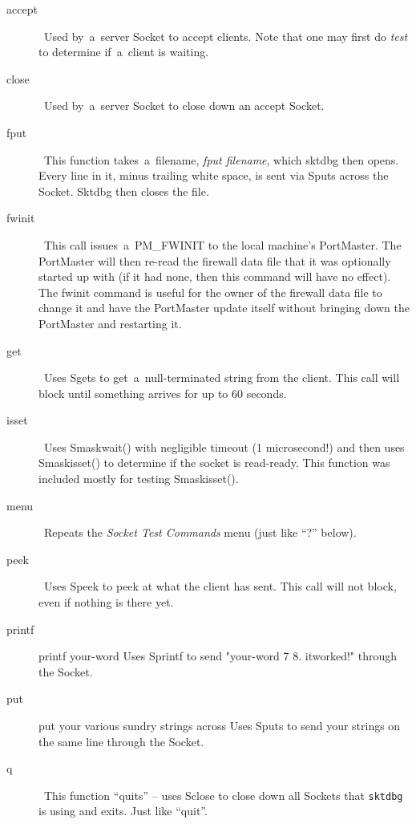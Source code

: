 \documentclass[12pt]{article}
\begin{document}
\begin{description}

  \item[accept] \   Used by~a~server Socket to accept clients.  Note that one
  may first do {\em test} to determine if~a~client is waiting.

  \item[close] \   Used by~a~server Socket to close down an accept Socket.

  \item[fput] \   This function takes~a~filename, {\em fput filename}, which sktdbg then opens.
  Every line in it, minus trailing white space, is sent via Sputs across the
  Socket.  Sktdbg then closes the file.

  \item[fwinit] \   This call issues~a~{\small PM\_FWINIT} to the local machine's PortMaster.
  The PortMaster will then re-read the firewall data file that it was optionally
  started up with (if it had none, then this command will have no effect).  The
  fwinit command is useful for the owner of the firewall data file to change it
  and have the PortMaster update itself without bringing down the PortMaster and
  restarting it.

  \item[get] \   Uses Sgets to get~a~null-terminated string from the client.  This call will
  block until something arrives for up to 60 seconds.

  \item[isset] \   Uses Smaskwait() with negligible timeout (1 microsecond!) and then uses
  Smaskisset() to determine if the socket is read-ready.  This function
  was included mostly for testing Smaskisset().

  \item[menu] \   Repeats the {\em Socket Test Commands} menu (just like ``?'' below).

  \item[peek] \   Uses Speek to peek at what the client has sent.  This call
  will not block, even if nothing is there yet.

  \item[printf] printf your-word   Uses Sprintf to send "your-word 7 8. itworked!" through the Socket.

  \item[put] put your various sundry strings across   Uses Sputs to send your strings on the same line through the Socket.

  \item[q] \   This function ``quits'' -- uses Sclose to close down all Sockets that
  \verb`sktdbg` is using and exits.  Just like ``quit''.


\end{description}
\end{document}
